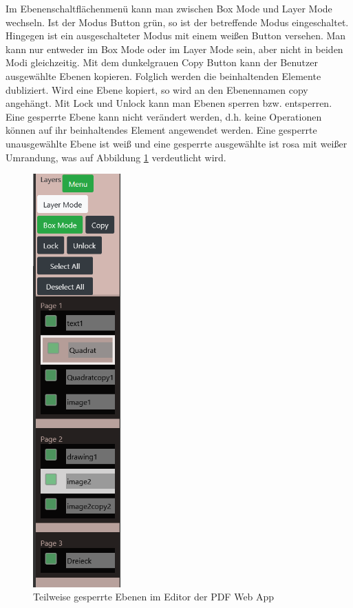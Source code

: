 Im Ebenenschaltflächenmenü kann man zwischen Box Mode und Layer Mode wechseln. Ist der Modus Button grün, so ist der betreffende Modus eingeschaltet. Hingegen ist ein ausgeschalteter Modus mit einem weißen Button versehen. Man kann nur entweder im Box Mode oder im Layer Mode sein, aber nicht in beiden Modi gleichzeitig. Mit dem dunkelgrauen Copy Button kann der Benutzer ausgewählte Ebenen kopieren. Folglich werden die beinhaltenden Elemente dubliziert. Wird eine Ebene kopiert, so wird an den Ebenennamen copy angehängt. Mit Lock und Unlock kann man Ebenen sperren bzw. entsperren. Eine gesperrte Ebene kann nicht verändert werden, d.h. keine Operationen können auf ihr beinhaltendes Element angewendet werden. Eine gesperrte unausgewählte Ebene ist weiß und eine gesperrte ausgewählte ist rosa mit weißer Umrandung, was auf Abbildung \ref{fig:ebenen2} verdeutlicht wird. 

\begin{figure}[!htbp]
	\centering
	\includegraphics[width=0.3\textwidth]{"images/ebenen2.png"}
	\caption{Teilweise gesperrte Ebenen im Editor der PDF Web App}
	\label{fig:ebenen2}
\end{figure}

